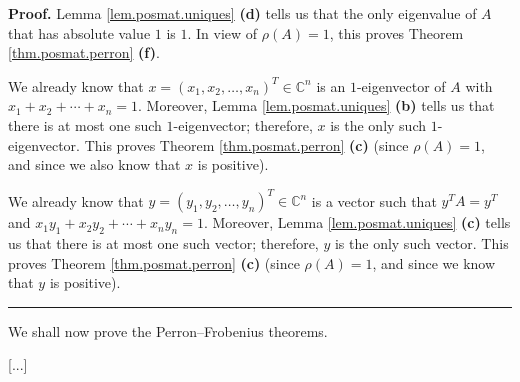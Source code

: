 \documentclass[numbers=enddot,12pt,final,onecolumn,notitlepage]{scrartcl}%
\numberwithin{exer}{subsection}
\theoremstyle{definition}
\newenvironment{proof}[1][Proof]{\noindent\textbf{#1.} }{\ \rule{0.5em}{0.5em}}
\begin{document}
\begin{proof}
Lemma \ref{lem.posmat.uniques} \textbf{(d)} tells us that the only eigenvalue
of $A$ that has absolute value $1$ is $1$. In view of $\rho\left(  A\right)
=1$, this proves Theorem \ref{thm.posmat.perron} \textbf{(f)}.

We already know that $x=\left(  x_{1},x_{2},\ldots,x_{n}\right)  ^{T}%
\in\mathbb{C}^{n}$ is an $1$-eigenvector of $A$ with $x_{1}+x_{2}+\cdots
+x_{n}=1$. Moreover, Lemma \ref{lem.posmat.uniques} \textbf{(b)} tells us that
there is at most one such $1$-eigenvector; therefore, $x$ is the only such
$1$-eigenvector. This proves Theorem \ref{thm.posmat.perron} \textbf{(c)}
(since $\rho\left(  A\right)  =1$, and since we also know that $x$ is positive).

We already know that $y=\left(  y_{1},y_{2},\ldots,y_{n}\right)  ^{T}%
\in\mathbb{C}^{n}$ is a vector such that $y^{T}A=y^{T}$ and $x_{1}y_{1}%
+x_{2}y_{2}+\cdots+x_{n}y_{n}=1$. Moreover, Lemma \ref{lem.posmat.uniques}
\textbf{(c)} tells us that there is at most one such vector; therefore, $y$ is
the only such vector. This proves Theorem \ref{thm.posmat.perron} \textbf{(c)}
(since $\rho\left(  A\right)  =1$, and since we know that $y$ is positive).
\end{proof}

We shall now prove the Perron--Frobenius theorems.

[...]

\newpage
\end{document}
